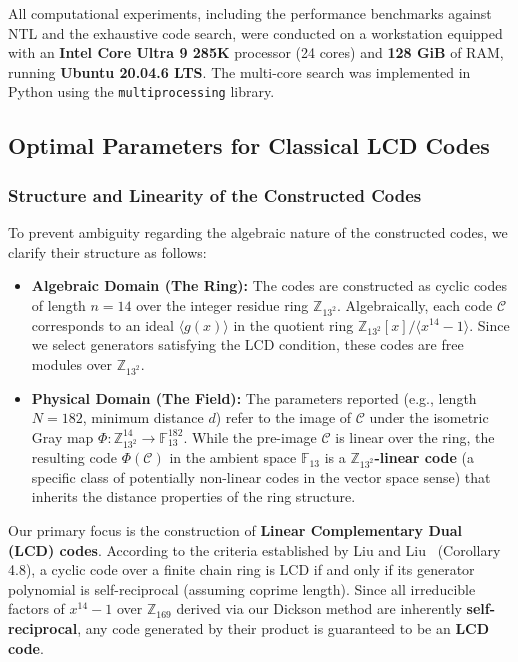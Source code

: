 \documentclass[12pt]{article}
\theoremstyle{plain}
\numberwithin{equation}{section}
\begin{document}
All computational experiments, including the performance benchmarks against NTL and the exhaustive code search, were conducted on a workstation equipped with an \textbf{Intel Core\texttrademark{} Ultra 9 285K} processor (24 cores) and \textbf{128 GiB} of RAM, running \textbf{Ubuntu 20.04.6 LTS}. The multi-core search was implemented in Python using the \texttt{multiprocessing} library.

\subsection{Optimal Parameters for Classical LCD Codes}

\subsubsection*{Structure and Linearity of the Constructed Codes}

To prevent ambiguity regarding the algebraic nature of the constructed codes, we clarify their structure as follows:
\begin{itemize}
    \item \textbf{Algebraic Domain (The Ring):} The codes are constructed as cyclic codes of length $n=14$ over the integer residue ring $\mathbb{Z}_{13^2}$. Algebraically, each code $\mathcal{C}$ corresponds to an ideal $\langle g(x) \rangle$ in the quotient ring $\mathbb{Z}_{13^2}[x]/\langle x^{14}-1 \rangle$. Since we select generators satisfying the LCD condition, these codes are free modules over $\mathbb{Z}_{13^2}$.
    
    \item \textbf{Physical Domain (The Field):} The parameters reported (e.g., length $N=182$, minimum distance $d$) refer to the image of $\mathcal{C}$ under the isometric Gray map $\Phi: \mathbb{Z}_{13^2}^{14} \to \mathbb{F}_{13}^{182}$. While the pre-image $\mathcal{C}$ is linear over the ring, the resulting code $\Phi(\mathcal{C})$ in the ambient space $\mathbb{F}_{13}$ is a \textbf{$\mathbb{Z}_{13^2}$-linear code} (a specific class of potentially non-linear codes in the vector space sense) that inherits the distance properties of the ring structure.
\end{itemize}

Our primary focus is the construction of \textbf{Linear Complementary Dual (LCD) codes}. According to the criteria established by Liu and Liu~\cite{Liu2015} (Corollary 4.8), a cyclic code over a finite chain ring is LCD if and only if its generator polynomial is self-reciprocal (assuming coprime length). Since all irreducible factors of $x^{14}-1$ over $\mathbb{Z}_{169}$ derived via our Dickson method are inherently \textbf{self-reciprocal}, any code generated by their product is guaranteed to be an \textbf{LCD code}.
\end{document}
